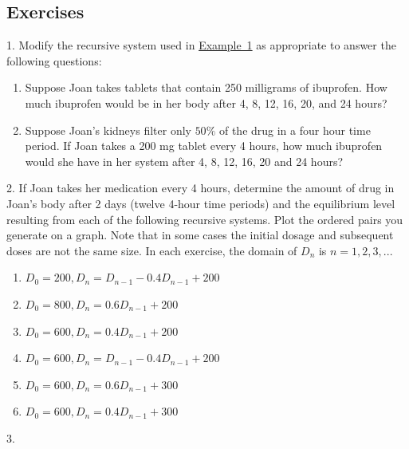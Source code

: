 \documentclass[10pt,]{book}
\theoremstyle{plain}
\theoremstyle{definition}
\theoremstyle{definition}
\theoremstyle{definition}
\numberwithin{equation}{section}
\begin{document}
\subsection[{Exercises}]{Exercises}\label{exercises-2}
\begin{exerciselist}
\item[1.]\hypertarget{exercise-3}{}\hypertarget{p-21}{}%
Modify the recursive  system  used in \hyperref[ibuprofen-example-one-dose]{Example~1} as appropriate to answer the following questions: \leavevmode%
\begin{enumerate}[label=(\alph*)]
\item\hypertarget{li-7}{}Suppose Joan takes tablets that contain 250 milligrams of ibuprofen.  How much ibuprofen would be in her body after 4, 8, 12, 16, 20, and 24 hours?%
\item\hypertarget{li-8}{}Suppose Joan’s kidneys filter only \(50\%\) of the drug in a four hour time period.  If Joan takes a 200 mg tablet every 4 hours, how much ibuprofen would she  have in her system after  4, 8, 12, 16, 20 and 24 hours?%
\end{enumerate}
%
\par\smallskip
\item[2.]\hypertarget{exercise-4}{}\hypertarget{p-22}{}%
If Joan takes her medication every 4 hours, determine the amount of drug in Joan’s body after 2 days (twelve  4-hour time periods) and the equilibrium level resulting from each of the following recursive systems.  Plot the ordered pairs you generate on a graph.  Note that in some cases the initial dosage and subsequent doses are not the same size.  In each exercise, the domain of \(D_n\) is \(n=1,2,3, ...\) \leavevmode%
\begin{enumerate}[label=(\alph*)]
\item\hypertarget{li-9}{}\(D_0=200, D_n=D_{n-1} - 0.4D_{n-1} + 200\)%
\item\hypertarget{li-10}{}\(D_0=800, D_n=0.6D_{n-1} + 200\)%
\item\hypertarget{li-11}{}\(D_0=600, D_n=0.4D_{n-1} + 200\)%
\item\hypertarget{li-12}{}\(D_0=600, D_n=D_{n-1} - 0.4D_{n-1} + 200\)%
\item\hypertarget{li-13}{}\(D_0=600, D_n=0.6D_{n-1} + 300\)%
\item\hypertarget{li-14}{}\(D_0=600, D_n=0.4D_{n-1} + 300\)%
\end{enumerate}
%
\par\smallskip
\item[3.]\hypertarget{exercise-5}{}\hypertarget{p-23}{}%

\end{exerciselist}
\end{document}
